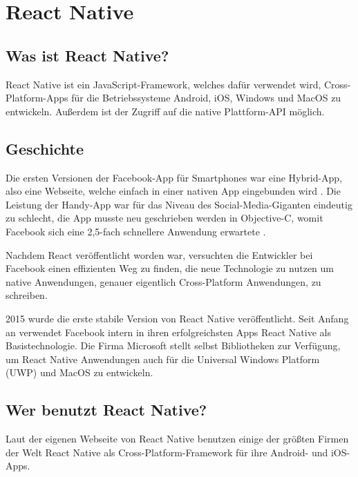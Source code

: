 \section{React Native}
\label{reactnative}

\subsection{Was ist React Native?}
React Native ist ein JavaScript-Framework, welches dafür verwendet wird, Cross-Platform-Apps für
die Betriebssysteme Android, iOS, Windows und MacOS zu entwickeln. Außerdem ist der Zugriff auf die
native Plattform-API möglich.

\subsection{Geschichte}
Die ersten Versionen der Facebook-App für Smartphones war eine Hybrid-App, also eine Webseite,
welche einfach in einer nativen App eingebunden wird \cite{reactNativeHistory}. Die Leistung der
Handy-App war für das Niveau des Social-Media-Giganten eindeutig zu schlecht, die App musste neu
geschrieben werden in Objective-C, womit Facebook sich eine 2,5-fach schnellere Anwendung erwartete
\cite{facebookNewIosApp}.

Nachdem React veröffentlicht worden war, versuchten die Entwickler bei Facebook einen effizienten
Weg zu finden, die neue Technologie zu nutzen um native Anwendungen, genauer eigentlich
Cross-Platform Anwendungen, zu schreiben.

2015 wurde die erste stabile Version von React Native veröffentlicht. Seit Anfang an verwendet
Facebook intern in ihren erfolgreichsten Apps React Native als Basistechnologie. Die Firma Microsoft
stellt selbst Bibliotheken zur Verfügung, um React Native Anwendungen auch für die Universal Windows
Platform (UWP) und MacOS zu entwickeln.

\subsection{Wer benutzt React Native?}
Laut der eigenen Webseite von React Native benutzen einige der größten Firmen der Welt React Native
als Cross-Platform-Framework für ihre Android- und iOS-Apps.

